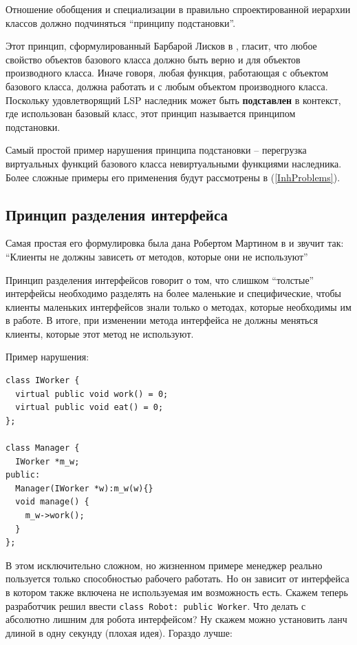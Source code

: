 \documentclass[a4paper,12pt,oneside]{book}
\begin{document}
Отношение обобщения и специализации в правильно спроектированной иерархии классов должно подчиняться ``принципу подстановки''. 

Этот принцип, сформулированный Барбарой Лисков в \cite{LSP}, гласит, что любое свойство объектов базового класса должно быть верно и для объектов производного класса. Иначе говоря, любая функция, работающая с объектом базового класса, должна работать и с любым объектом производного класса. Поскольку удовлетворящий LSP наследник может быть \textbf{подставлен} в контекст, где использован базовый класс, этот принцип называется принципом подстановки.

Самый простой пример нарушения принципа подстановки -- перегрузка виртуальных функций базового класса невиртуальными функциями наследника. Более сложные примеры его применения будут рассмотрены в (\ref{InhProblems}).

\subsection{Принцип разделения интерфейса}\label{ISP}

Самая простая его формулировка была дана Робертом Мартином в \cite{ISP} и звучит так: ``Клиенты не должны зависеть от методов, которые они не используют''

Принцип разделения интерфейсов говорит о том, что слишком ``толстые'' интерфейсы необходимо разделять на более маленькие и специфические, чтобы клиенты маленьких интерфейсов знали только о методах, которые необходимы им в работе. В итоге, при изменении метода интерфейса не должны меняться клиенты, которые этот метод не используют.

Пример нарушения:

\begin{lstlisting}
class IWorker {
  virtual public void work() = 0;
  virtual public void eat() = 0;
};

class Manager {
  IWorker *m_w;
public:
  Manager(IWorker *w):m_w(w){}
  void manage() {
    m_w->work();
  }
};
\end{lstlisting}

В этом исключительно сложном, но жизненном примере менеджер реально пользуется только способностью рабочего работать. Но он зависит от интерфейса в котором также включена не используемая им возможность есть. Скажем теперь разработчик решил ввести \lstinline!class Robot: public Worker!. Что делать с абсолютно лишним для робота интерфейсом? Ну скажем можно установить ланч длиной в одну секунду (плохая идея). Гораздо лучше:
\end{document}
